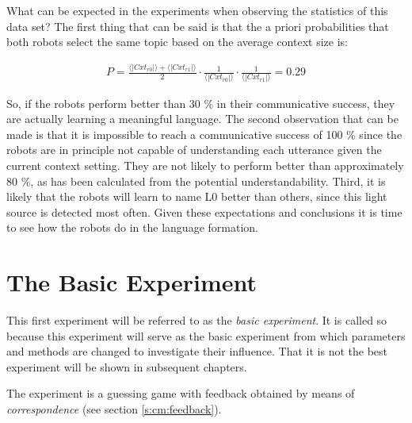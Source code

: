 What can be expected in the experiments when observing the statistics of this data set? The first thing that can be said is that the a priori probabilities that both robots select the same topic based on the average context size is:

\begin{eqnarray*}
P=\frac{\langle|Cxt_{r0}|\rangle+\langle|Cxt_{r1}|\rangle}{2}\cdot \frac{1}{\langle|Cxt_{r0}|\rangle} \cdot \frac{1}{\langle|Cxt_{r1}|\rangle}=0.29
\end{eqnarray*}


So, if the robots perform better than 30 \% in their communicative success, they are actually learning a meaningful language. The second observation that can be made is that it is impossible to reach a communicative success of 100 \% since the robots are in principle not capable of understanding each utterance given the current context setting. They are not likely to perform better than approximately 80 \%, as has been calculated from the potential understandability. Third, it is likely that the robots will learn to name L0 better than others, since this light source is detected most often. Given these expectations and conclusions it is time to see how the robots do in the language formation.


\section{The Basic Experiment}\label{s:st:experiment}

This first experiment will be referred to as the {\em basic experiment}. It is called so because this experiment will serve as the basic experiment from which parameters and methods are changed to investigate their influence. That it is not the best experiment will be shown in subsequent chapters.


The experiment is a guessing game with feedback obtained by means of {\em correspondence} (see section \ref{s:cm:feedback}). 

